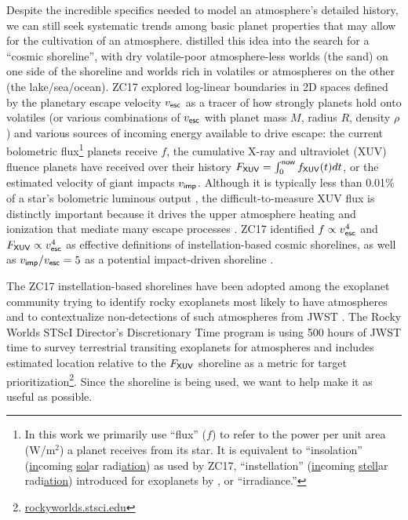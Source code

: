 \documentclass[modern,linenumbers,trackchanges]{aastex7}
\begin{document}
Despite the incredible specifics needed to model an atmosphere's detailed history, we can still seek systematic trends among basic planet properties that may allow for the cultivation of an atmosphere. \citet[][hereafter ZC17]{zahnleCosmicShorelineEvidence2017a} distilled this idea into the search for a ``cosmic shoreline'', with dry volatile-poor atmosphere-less worlds (the sand) on one side of the shoreline and worlds rich in volatiles or atmospheres on the other (the lake/sea/ocean). ZC17 explored log-linear boundaries in 2D spaces defined by the planetary escape velocity $v_{\sf esc}$ as a tracer of how strongly planets hold onto volatiles (or various combinations of $v_{\sf esc}$ with planet mass $M$, radius $R$, density $\rho$) and various sources of incoming energy available to drive escape: the current bolometric flux\footnote{In this work we primarily use ``flux'' ($f$) to refer to the power per unit area (W/m$^2$) a planet receives from its star. It is equivalent to ``insolation'' (\underline{in}coming \underline{sol}ar radi\underline{ation}) as used by ZC17, ``instellation'' (\underline{in}coming \underline{stell}ar radi\underline{ation}) introduced for exoplanets by \citet{shieldsEffectHostStar2013}, or ``irradiance.''}
planets receive $f$, the cumulative X-ray and ultraviolet (XUV) fluence planets have received over their history $F_{\sf XUV} = \int_{0}^{\sf now}f_{\sf XUV}(t) dt$, or the estimated velocity of giant impacts $v_{\sf imp}$. Although it is typically less than 0.01\% of a star's bolometric luminous output \citep{franceMUSCLESTreasurySurvey2016}, the difficult-to-measure XUV flux is distinctly important because it drives the upper atmosphere heating and ionization that mediate many escape processes \citep{linskyInferringIntrinsicStellar2024}. ZC17 identified $f \propto v_{\sf esc}^4$ and $F_{\sf XUV} \propto v_{\sf esc}^4$ as effective definitions of instellation-based cosmic shorelines, as well as $v_{\sf imp}/v_{\sf esc} = 5$ as a potential impact-driven shoreline \citep[see also][]{zahnleOriginsAtmospheres1998}.

The ZC17 instellation-based shorelines have been adopted among the exoplanet community trying to identify rocky exoplanets most likely to have atmospheres and to contextualize non-detections of such atmospheres from JWST \citep[][and references therein]{parkcoyPopulationlevelHypothesisTesting2024}. The Rocky Worlds STScI Director's Discretionary Time program is using 500 hours of JWST time to survey terrestrial transiting exoplanets for atmospheres \citep{redfieldReportWorkingGroup2024} and includes estimated location relative to the $F_{\sf XUV}$ shoreline as a metric for target prioritization\footnote{\href{https://rockyworlds.stsci.edu/}{rockyworlds.stsci.edu}}. Since the shoreline is being used, we want to help make it as useful as possible. 
\end{document}
